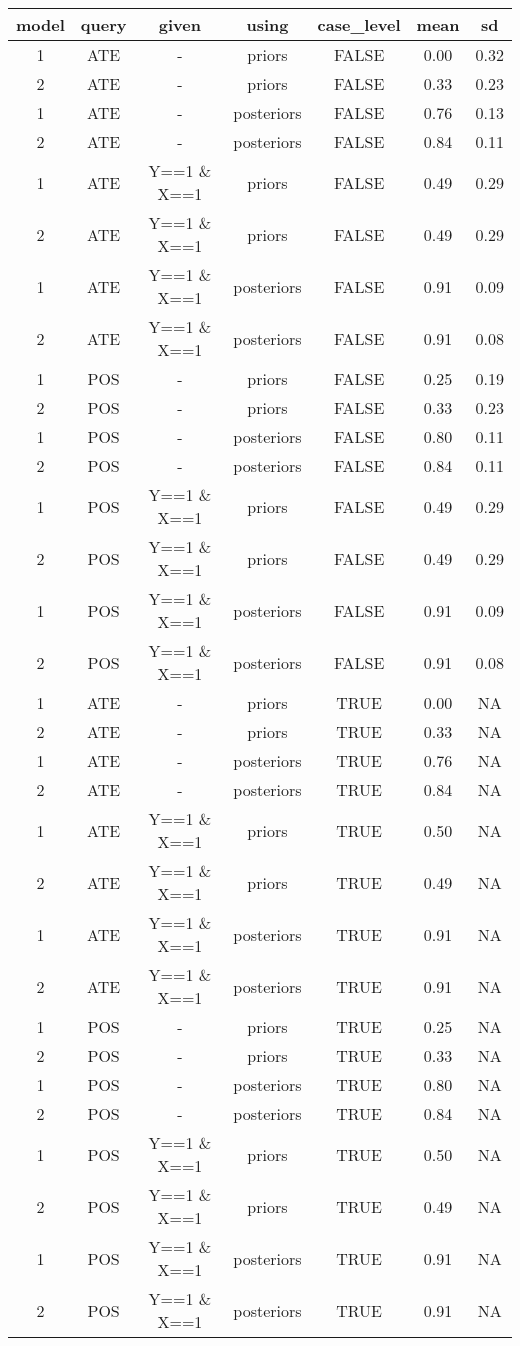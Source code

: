\documentclass[
  11pt,
  article]{jss}
\begin{document}
\begin{longtable}{ccccccc}
\toprule
model & query & given & using & case\_level & mean & sd\\
\midrule
1 & ATE & - & priors & FALSE & 0.00 & 0.32\\
2 & ATE & - & priors & FALSE & 0.33 & 0.23\\
1 & ATE & - & posteriors & FALSE & 0.76 & 0.13\\
2 & ATE & - & posteriors & FALSE & 0.84 & 0.11\\
1 & ATE & Y==1 \& X==1 & priors & FALSE & 0.49 & 0.29\\
2 & ATE & Y==1 \& X==1 & priors & FALSE & 0.49 & 0.29\\
1 & ATE & Y==1 \& X==1 & posteriors & FALSE & 0.91 & 0.09\\
2 & ATE & Y==1 \& X==1 & posteriors & FALSE & 0.91 & 0.08\\
1 & POS & - & priors & FALSE & 0.25 & 0.19\\
2 & POS & - & priors & FALSE & 0.33 & 0.23\\
1 & POS & - & posteriors & FALSE & 0.80 & 0.11\\
2 & POS & - & posteriors & FALSE & 0.84 & 0.11\\
1 & POS & Y==1 \& X==1 & priors & FALSE & 0.49 & 0.29\\
2 & POS & Y==1 \& X==1 & priors & FALSE & 0.49 & 0.29\\
1 & POS & Y==1 \& X==1 & posteriors & FALSE & 0.91 & 0.09\\
2 & POS & Y==1 \& X==1 & posteriors & FALSE & 0.91 & 0.08\\
1 & ATE & - & priors & TRUE & 0.00 & NA\\
2 & ATE & - & priors & TRUE & 0.33 & NA\\
1 & ATE & - & posteriors & TRUE & 0.76 & NA\\
2 & ATE & - & posteriors & TRUE & 0.84 & NA\\
1 & ATE & Y==1 \& X==1 & priors & TRUE & 0.50 & NA\\
2 & ATE & Y==1 \& X==1 & priors & TRUE & 0.49 & NA\\
1 & ATE & Y==1 \& X==1 & posteriors & TRUE & 0.91 & NA\\
2 & ATE & Y==1 \& X==1 & posteriors & TRUE & 0.91 & NA\\
1 & POS & - & priors & TRUE & 0.25 & NA\\
2 & POS & - & priors & TRUE & 0.33 & NA\\
1 & POS & - & posteriors & TRUE & 0.80 & NA\\
2 & POS & - & posteriors & TRUE & 0.84 & NA\\
1 & POS & Y==1 \& X==1 & priors & TRUE & 0.50 & NA\\
2 & POS & Y==1 \& X==1 & priors & TRUE & 0.49 & NA\\
1 & POS & Y==1 \& X==1 & posteriors & TRUE & 0.91 & NA\\
2 & POS & Y==1 \& X==1 & posteriors & TRUE & 0.91 & NA\\
\bottomrule
\end{longtable}
\end{document}
